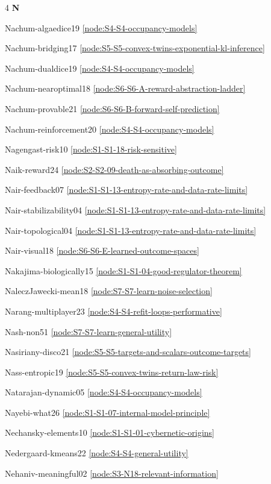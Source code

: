 \documentclass[10pt]{article}
\begin{document}
{\begin{multicols}{4}
\smallskip\textbf{N}\par
Nachum-algaedice19 \hfill \ref{node:S4-S4-occupancy-models}\par
Nachum-bridging17 \hfill \ref{node:S5-S5-convex-twins-exponential-kl-inference}\par
Nachum-dualdice19 \hfill \ref{node:S4-S4-occupancy-models}\par
Nachum-nearoptimal18 \hfill \ref{node:S6-S6-A-reward-abstraction-ladder}\par
Nachum-provable21 \hfill \ref{node:S6-S6-B-forward-self-prediction}\par
Nachum-reinforcement20 \hfill \ref{node:S4-S4-occupancy-models}\par
Nagengast-risk10 \hfill \ref{node:S1-S1-18-risk-sensitive}\par
Naik-reward24 \hfill \ref{node:S2-S2-09-death-as-absorbing-outcome}\par
Nair-feedback07 \hfill \ref{node:S1-S1-13-entropy-rate-and-data-rate-limits}\par
Nair-stabilizability04 \hfill \ref{node:S1-S1-13-entropy-rate-and-data-rate-limits}\par
Nair-topological04 \hfill \ref{node:S1-S1-13-entropy-rate-and-data-rate-limits}\par
Nair-visual18 \hfill \ref{node:S6-S6-E-learned-outcome-spaces}\par
Nakajima-biologically15 \hfill \ref{node:S1-S1-04-good-regulator-theorem}\par
NaleczJawecki-mean18 \hfill \ref{node:S7-S7-learn-noise-selection}\par
Narang-multiplayer23 \hfill \ref{node:S4-S4-refit-loops-performative}\par
Nash-non51 \hfill \ref{node:S7-S7-learn-general-utility}\par
Nasiriany-disco21 \hfill \ref{node:S5-S5-targets-and-scalars-outcome-targets}\par
Nass-entropic19 \hfill \ref{node:S5-S5-convex-twins-return-law-risk}\par
Natarajan-dynamic05 \hfill \ref{node:S4-S4-occupancy-models}\par
Nayebi-what26 \hfill \ref{node:S1-S1-07-internal-model-principle}\par
Nechansky-elements10 \hfill \ref{node:S1-S1-01-cybernetic-origins}\par
Nedergaard-kmeans22 \hfill \ref{node:S4-S4-general-utility}\par
Nehaniv-meaningful02 \hfill \ref{node:S3-N18-relevant-information}\par

\end{multicols}}
\end{document}
